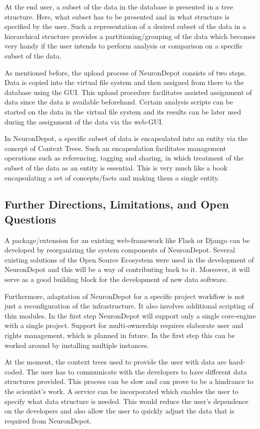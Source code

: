 \documentclass{frontiersSCNS} %
\begin{document}
At the end user, a subset of the data in the database is presented in a tree
structure. Here, what subset has to be presented and in what structure is
specified by the user. Such a representation of a desired subset of the data in
a hierarchical structure provides a partitioning/grouping of the data which
becomes very handy if the user intends to perform analysis or comparison on a
specific subset of the data.

As mentioned before, the upload process of NeuronDepot consists of two steps.
Data is copied into the virtual file system and then assigned from there to the
database using the GUI. This upload procedure facilitates assisted assignment
of data since the data is available beforehand. Certain analysis scripts can be
started on the data in the virtual file system and its results can be later
used during the assignment of the data via the web-GUI.

In NeuronDepot, a specific subset of data is encapsulated into an entity via
the concept of Context Trees. Such an encapsulation facilitates management
operations such as referencing, tagging and sharing, in which treatment of the
subset of the data as an entity is essential. This is very much like a book
encapsulating a set of concepts/facts and making them a single entity.

\subsection{Further Directions, Limitations, and Open Questions}

A package/extension for an existing web-framework like Flask or Django can be
developed by reorganizing the system components of NeuronDepot. Several
existing solutions of the Open Source Ecosystem were used in the development of
NeuronDepot and this will be a way of contributing back to it. Moreover, it
will serve as a good building block for the development of new data software.

Furthermore, adaptation of NeuronDepot for a specific project workflow is not
just a reconfiguration of the infrastructure. It also involves additional
scripting of thin modules. In the first step NeuronDepot will support only a
single core-engine with a single project. Support for multi-ownership
requires elaborate user and rights management, which is planned in future. In
the first step this can be worked around by installing multiple instances.

At the moment, the context trees used to provide the user with data are
hard-coded. The user has to communicate with the developers to have different
data structures provided. This process can be slow and can prove to be a
hindrance to the scientist's work. A service can be incorporated which enables
the user to specify what data structure is needed. This would reduce the user's
dependence on the developers and also allow the user to quickly adjust the data
that is required from NeuronDepot.
\end{document}

